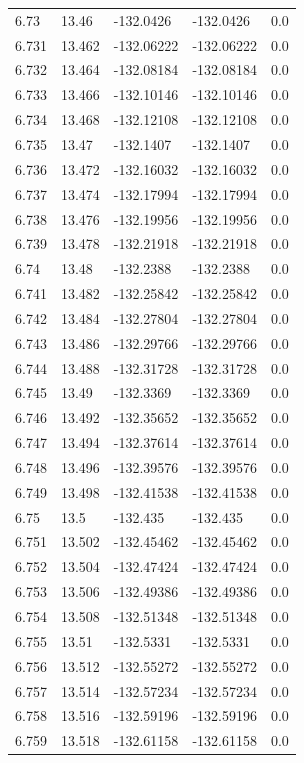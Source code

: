 \begin{tabular}{lllll}
6.73 & 13.46 & -132.0426 & -132.0426 & 0.0 \\
6.731 & 13.462 & -132.06222 & -132.06222 & 0.0 \\
6.732 & 13.464 & -132.08184 & -132.08184 & 0.0 \\
6.733 & 13.466 & -132.10146 & -132.10146 & 0.0 \\
6.734 & 13.468 & -132.12108 & -132.12108 & 0.0 \\
6.735 & 13.47 & -132.1407 & -132.1407 & 0.0 \\
6.736 & 13.472 & -132.16032 & -132.16032 & 0.0 \\
6.737 & 13.474 & -132.17994 & -132.17994 & 0.0 \\
6.738 & 13.476 & -132.19956 & -132.19956 & 0.0 \\
6.739 & 13.478 & -132.21918 & -132.21918 & 0.0 \\
6.74 & 13.48 & -132.2388 & -132.2388 & 0.0 \\
6.741 & 13.482 & -132.25842 & -132.25842 & 0.0 \\
6.742 & 13.484 & -132.27804 & -132.27804 & 0.0 \\
6.743 & 13.486 & -132.29766 & -132.29766 & 0.0 \\
6.744 & 13.488 & -132.31728 & -132.31728 & 0.0 \\
6.745 & 13.49 & -132.3369 & -132.3369 & 0.0 \\
6.746 & 13.492 & -132.35652 & -132.35652 & 0.0 \\
6.747 & 13.494 & -132.37614 & -132.37614 & 0.0 \\
6.748 & 13.496 & -132.39576 & -132.39576 & 0.0 \\
6.749 & 13.498 & -132.41538 & -132.41538 & 0.0 \\
6.75 & 13.5 & -132.435 & -132.435 & 0.0 \\
6.751 & 13.502 & -132.45462 & -132.45462 & 0.0 \\
6.752 & 13.504 & -132.47424 & -132.47424 & 0.0 \\
6.753 & 13.506 & -132.49386 & -132.49386 & 0.0 \\
6.754 & 13.508 & -132.51348 & -132.51348 & 0.0 \\
6.755 & 13.51 & -132.5331 & -132.5331 & 0.0 \\
6.756 & 13.512 & -132.55272 & -132.55272 & 0.0 \\
6.757 & 13.514 & -132.57234 & -132.57234 & 0.0 \\
6.758 & 13.516 & -132.59196 & -132.59196 & 0.0 \\
6.759 & 13.518 & -132.61158 & -132.61158 & 0.0 \\

\end{tabular}
